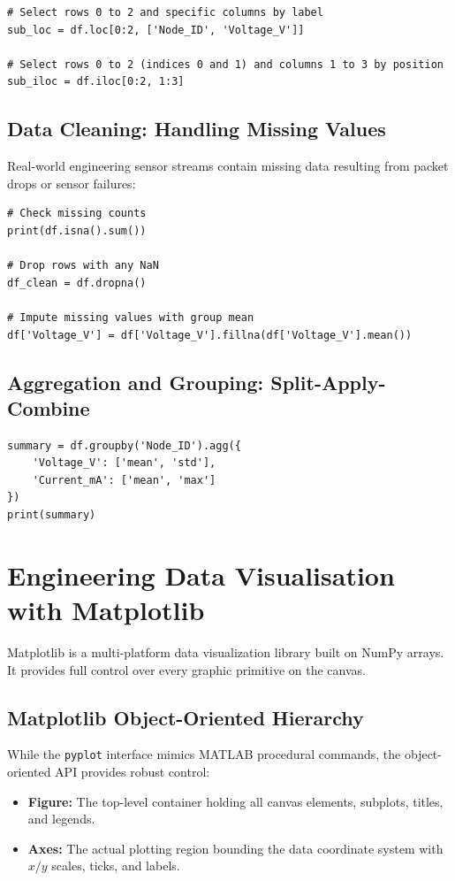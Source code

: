 \begin{lstlisting}[caption={Label vs Position Slicing}]
# Select rows 0 to 2 and specific columns by label
sub_loc = df.loc[0:2, ['Node_ID', 'Voltage_V']]

# Select rows 0 to 2 (indices 0 and 1) and columns 1 to 3 by position
sub_iloc = df.iloc[0:2, 1:3]
\end{lstlisting}

\subsection{Data Cleaning: Handling Missing Values}
Real-world engineering sensor streams contain missing data resulting from packet drops or sensor failures:
\begin{lstlisting}[caption={Handling Missing Data}]
# Check missing counts
print(df.isna().sum())

# Drop rows with any NaN
df_clean = df.dropna()

# Impute missing values with group mean
df['Voltage_V'] = df['Voltage_V'].fillna(df['Voltage_V'].mean())
\end{lstlisting}

\subsection{Aggregation and Grouping: Split-Apply-Combine}
\begin{lstlisting}[caption={Group-by Aggregations}]
summary = df.groupby('Node_ID').agg({
    'Voltage_V': ['mean', 'std'],
    'Current_mA': ['mean', 'max']
})
print(summary)
\end{lstlisting}

\section{Engineering Data Visualisation with Matplotlib}

Matplotlib is a multi-platform data visualization library built on NumPy arrays. It provides full control over every graphic primitive on the canvas.

\subsection{Matplotlib Object-Oriented Hierarchy}
While the \texttt{pyplot} interface mimics MATLAB procedural commands, the object-oriented API provides robust control:
\begin{itemize}[leftmargin=1.8em, itemsep=2pt]
    \item \textbf{Figure:} The top-level container holding all canvas elements, subplots, titles, and legends.
    \item \textbf{Axes:} The actual plotting region bounding the data coordinate system with $x/y$ scales, ticks, and labels.
\end{itemize}

